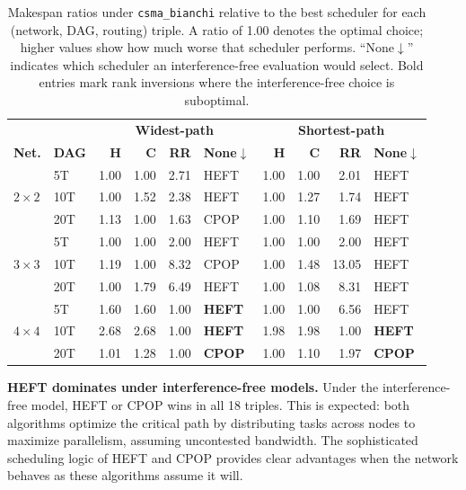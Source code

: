 \documentclass[conference]{IEEEtran}
\begin{document}
\begin{table}[t]
\centering
\caption{Makespan ratios under \texttt{csma\_bianchi} relative to the best
  scheduler for each (network, DAG, routing) triple.  A ratio of 1.00
  denotes the optimal choice; higher values show how much worse that
  scheduler performs.  ``None$\downarrow$'' indicates which scheduler an
  interference-free evaluation would select.  Bold entries mark rank
  inversions where the interference-free choice is suboptimal.}
\label{tab:winner_matrix}
\setlength{\tabcolsep}{3.5pt}
\begin{tabular}{@{}ll|rrrl|rrrl@{}}
\toprule
& & \multicolumn{4}{c|}{\textbf{Widest-path}} &
  \multicolumn{4}{c}{\textbf{Shortest-path}} \\
\textbf{Net.} & \textbf{DAG} &
  \textbf{H} & \textbf{C} & \textbf{RR} & \textbf{None$\downarrow$} &
  \textbf{H} & \textbf{C} & \textbf{RR} & \textbf{None$\downarrow$} \\
\midrule
\multirow{3}{*}{$2\times2$}
  & 5T  & 1.00 & 1.00 & 2.71 & HEFT & 1.00 & 1.00 & 2.01 & HEFT \\
  & 10T & 1.00 & 1.52 & 2.38 & HEFT & 1.00 & 1.27 & 1.74 & HEFT \\
  & 20T & 1.13 & 1.00 & 1.63 & CPOP & 1.00 & 1.10 & 1.69 & HEFT \\
\midrule
\multirow{3}{*}{$3\times3$}
  & 5T  & 1.00 & 1.00 & 2.00 & HEFT & 1.00 & 1.00 & 2.00 & HEFT \\
  & 10T & 1.19 & 1.00 & 8.32 & CPOP & 1.00 & 1.48 & 13.05 & HEFT \\
  & 20T & 1.00 & 1.79 & 6.49 & HEFT & 1.00 & 1.08 & 8.31 & HEFT \\
\midrule
\multirow{3}{*}{$4\times4$}
  & 5T  & 1.60 & 1.60 & 1.00 & \textbf{HEFT} & 1.00 & 1.00 & 6.56 & HEFT \\
  & 10T & 2.68 & 2.68 & 1.00 & \textbf{HEFT} & 1.98 & 1.98 & 1.00 & \textbf{HEFT} \\
  & 20T & 1.01 & 1.28 & 1.00 & \textbf{CPOP} & 1.00 & 1.10 & 1.97 & \textbf{CPOP} \\
\bottomrule
\end{tabular}
\end{table}

\textbf{HEFT dominates under interference-free models.}  Under the
interference-free model, HEFT or CPOP wins in all 18 triples.  This
is expected: both algorithms optimize the critical path by distributing
tasks across nodes to maximize parallelism, assuming uncontested bandwidth.
The sophisticated scheduling logic of HEFT and CPOP provides clear
advantages when the network behaves as these algorithms assume it will.
\end{document}
